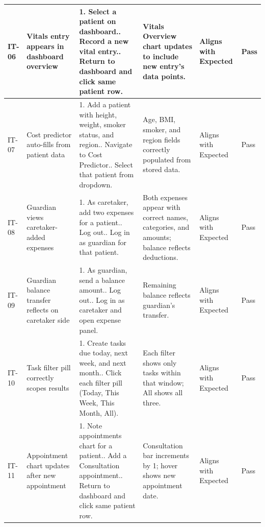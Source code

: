 \documentclass[12pt,a4paper]{article}
\begin{document}
\begin{longtable}{|p{1cm}|p{2.5cm}|p{3.5cm}|p{3.5cm}|p{2cm}|p{1.2cm}|}
    IT-06 & Vitals entry appears in dashboard overview &
        1. Select a patient on dashboard.\newline
        2. Record a new vital entry.\newline
        3. Return to dashboard and click same patient row. &
        Vitals Overview chart updates to include new entry's data points. &
        Aligns with Expected & Pass \\
    \hline
 
    IT-07 & Cost predictor auto-fills from patient data &
        1. Add a patient with height, weight, smoker status, and region.\newline
        2. Navigate to Cost Predictor.\newline
        3. Select that patient from dropdown. &
        Age, BMI, smoker, and region fields correctly populated from stored data. &
        Aligns with Expected & Pass \\
    \hline
 
    IT-08 & Guardian views caretaker-added expenses &
        1. As caretaker, add two expenses for a patient.\newline
        2. Log out.\newline
        3. Log in as guardian for that patient. &
        Both expenses appear with correct names, categories, and amounts; balance reflects deductions. &
        Aligns with Expected & Pass \\
    \hline
 
    IT-09 & Guardian balance transfer reflects on caretaker side &
        1. As guardian, send a balance amount.\newline
        2. Log out.\newline
        3. Log in as caretaker and open expense panel. &
        Remaining balance reflects guardian's transfer. &
        Aligns with Expected & Pass \\
    \hline
 
    IT-10 & Task filter pill correctly scopes results &
        1. Create tasks due today, next week, and next month.\newline
        2. Click each filter pill (Today, This Week, This Month, All). &
        Each filter shows only tasks within that window; All shows all three. &
        Aligns with Expected & Pass \\
    \hline
 
    IT-11 & Appointment chart updates after new appointment &
        1. Note appointments chart for a patient.\newline
        2. Add a Consultation appointment.\newline
        3. Return to dashboard and click same patient row. &
        Consultation bar increments by 1; hover shows new appointment date. &
        Aligns with Expected & Pass \\
    \hline
 

\end{longtable}
\end{document}
